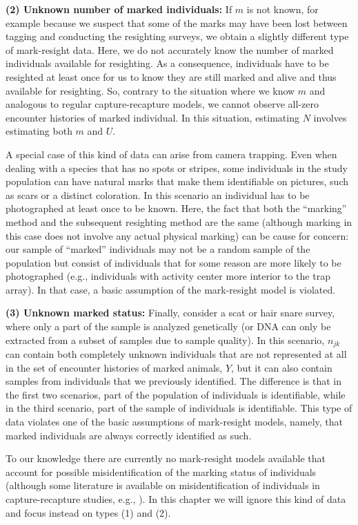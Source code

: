 {\flushleft \bf (2) Unknown number of marked individuals:} If $m$ is
not known, for example because we suspect that some of the marks may
have been lost between tagging and conducting the resighting surveys,
we obtain a slightly different type of mark-resight data. Here, we do
not accurately know the number of marked individuals available for
resighting. As a consequence, individuals have to be resighted at
least once for us to know they are still marked and alive and thus
available for resighting. So, contrary to the situation where we know
$m$ and analogous to regular capture-recapture models, we cannot
observe all-zero encounter histories of marked individual. In this
situation, estimating $N$ involves estimating both $m$ and $U$.

A special case of this kind of data can arise from camera
trapping. Even when dealing with a species that has no spots or
stripes, some individuals in the study population can have natural
marks that make them identifiable on pictures, such as scars or a
distinct coloration. In this scenario an individual has to be
photographed at least once to be known. Here, the fact that both the
``marking'' method and the subsequent resighting method are the same
(although marking in this case does not involve any actual physical
marking) can be cause for concern: our sample of ``marked''
individuals may not be a random sample of the population but consist
of individuals that for some reason are more likely to be
photographed (e.g., individuals with activity center more interior to
the trap array). In that case, a basic assumption of the mark-resight
model is violated.

{\flushleft \bf (3) Unknown marked status:} Finally, consider a scat
or hair snare survey, where only a part of the sample is analyzed
genetically (or DNA can only be extracted from a subset of samples due
to sample quality). In this scenario, $n_{jk}$ can contain both
completely unknown individuals that are not represented at all in the
set of encounter histories of marked animals, {\bf $Y$}, but
it can also contain samples from individuals that we previously
identified. The difference is that in the first two scenarios, part of
the population of individuals is identifiable, while in the third
scenario, part of the sample of individuals is identifiable. This type
of data violates one of the basic assumptions of mark-resight models,
namely, that marked individuals are always correctly identified as
such.

To our knowledge there are currently no mark-resight models available
that account for possible misidentification of the marking status of
individuals (although some literature is available on
misidentification of individuals in capture-recapture studies, e.g.,
\citealp{yoshizaki_etal:2009, lukacs_burnham:2005,
  link_etal:2010}). In this chapter we will ignore this kind of data
and focus instead on types (1) and (2).

